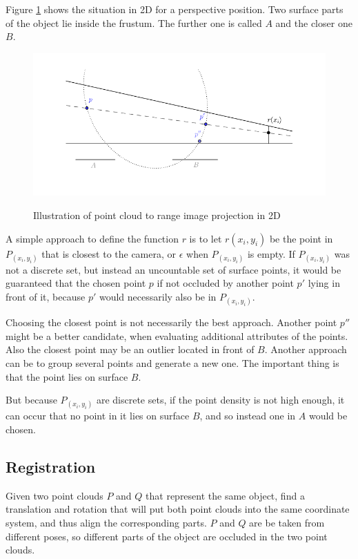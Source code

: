 Figure \ref{fig:pp_projection} shows the situation in 2D for a perspective position. Two surface parts of the object lie inside the frustum. The further one is called $A$ and the closer one $B$.

\begin{figure}[h]
\center
\includegraphics[width=.8\textwidth]{fig/pp_projection.pdf}
\label{fig:pp_projection}
\caption{Illustration of point cloud to range image projection in 2D}
\end{figure}

A simple approach to define the function $r$ is to let $r(x_i, y_i)$ be the point in $P_{(x_i,y_i)}$ that is closest to the camera, or $\epsilon$ when $P_{(x_i,y_i)}$ is empty. If $P_{(x_i,y_i)}$ was not a discrete set, but instead an uncountable set of surface points, it would be guaranteed that the chosen point $p$ if not occluded by another point $p'$ lying in front of it, because $p'$ would necessarily also be in $P_{(x_i,y_i)}$.

Choosing the closest point is not necessarily the best approach. Another point $p''$ might be a better candidate, when evaluating additional attributes of the points. Also the closest point may be an outlier located in front of $B$. Another approach can be to group several points and generate a new one. The important thing is that the point lies on surface $B$.

But because $P_{(x_i,y_i)}$ are discrete sets, if the point density is not high enough, it can occur that no point in it lies on surface $B$, and so instead one in $A$ would be chosen.



\subsection{Registration} \label{sec:pc_registration}
Given two point clouds $P$ and $Q$ that represent the same object, find a translation and rotation that will put both point clouds into the same coordinate system, and thus align the corresponding parts. $P$ and $Q$ are be taken from different poses, so different parts of the object are occluded in the two point clouds.

